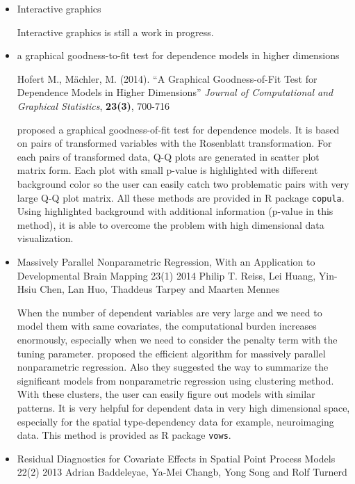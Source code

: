 \documentclass{article}
\begin{document}
\begin{itemize}
\item Interactive graphics

Interactive graphics is still a work in progress. 


\item a graphical goodness-to-fit test for dependence models in higher dimensions

Hofert M., M\"{a}chler, M. (2014).
``A Graphical Goodness-of-Fit Test for
Dependence Models in Higher Dimensions''
{\em Journal of Computational and Graphical Statistics}, {\bf 23(3)}, 700-716
\citep{hofert2013graphical}

\citet{hofert2013graphical} proposed a graphical goodness-of-fit test for dependence models.
It is based on pairs of transformed variables with the Rosenblatt transformation. For each pairs of transformed data, Q-Q plots are generated in scatter plot matrix form. Each plot with small p-value is highlighted with different background color so the user can easily catch two problematic pairs with very large Q-Q plot matrix. All these methods are provided in R package {\tt copula}. Using highlighted background with additional information (p-value in this method), it is able to overcome the problem with high dimensional data visualization.


\item Massively Parallel Nonparametric Regression, With an Application to Developmental Brain Mapping 23(1) 2014
Philip T. Reiss, Lei Huang, Yin-Hsiu Chen, Lan Huo, Thaddeus Tarpey and Maarten Mennes

When the number of dependent variables are very large and we need to model them with same covariates,
 the computational burden increases enormously, especially when we need to consider the penalty term with the tuning parameter. \citet{reiss2014massively} proposed  the efficient algorithm for massively parallel nonparametric regression.
 Also they suggested the way to summarize the significant models from nonparametric regression using clustering method. With these clusters, the user can easily figure out models with similar patterns. It is very helpful for dependent data in very high dimensional space, especially for the spatial type-dependency data for example, neuroimaging data. This method is provided as R package {\tt vows}.



\item Residual Diagnostics for Covariate Effects in Spatial Point Process Models 22(2) 2013 Adrian Baddeleyae, Ya-Mei Changb, Yong Song and Rolf Turnerd


\end{itemize}
\end{document}
